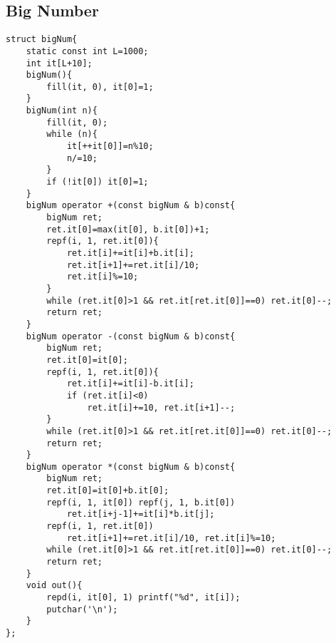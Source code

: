 \subsection{Big Number}
\begin{lstlisting}
struct bigNum{
	static const int L=1000;
	int it[L+10];
	bigNum(){
		fill(it, 0), it[0]=1;
	}
	bigNum(int n){
		fill(it, 0);
		while (n){
			it[++it[0]]=n%10;
			n/=10;
		}
		if (!it[0]) it[0]=1;
	}
	bigNum operator +(const bigNum & b)const{
		bigNum ret;
		ret.it[0]=max(it[0], b.it[0])+1;
		repf(i, 1, ret.it[0]){
			ret.it[i]+=it[i]+b.it[i];
			ret.it[i+1]+=ret.it[i]/10;
			ret.it[i]%=10;
		}
		while (ret.it[0]>1 && ret.it[ret.it[0]]==0) ret.it[0]--;
		return ret;
	}
	bigNum operator -(const bigNum & b)const{
		bigNum ret;
		ret.it[0]=it[0];
		repf(i, 1, ret.it[0]){
			ret.it[i]+=it[i]-b.it[i];
			if (ret.it[i]<0)
				ret.it[i]+=10, ret.it[i+1]--;
		}
		while (ret.it[0]>1 && ret.it[ret.it[0]]==0) ret.it[0]--;
		return ret;
	}
	bigNum operator *(const bigNum & b)const{
		bigNum ret;
		ret.it[0]=it[0]+b.it[0];
		repf(i, 1, it[0]) repf(j, 1, b.it[0])
			ret.it[i+j-1]+=it[i]*b.it[j];
		repf(i, 1, ret.it[0]) 
			ret.it[i+1]+=ret.it[i]/10, ret.it[i]%=10;			
		while (ret.it[0]>1 && ret.it[ret.it[0]]==0) ret.it[0]--;
		return ret;
	}
	void out(){
		repd(i, it[0], 1) printf("%d", it[i]);
		putchar('\n');
	}
};
\end{lstlisting}
